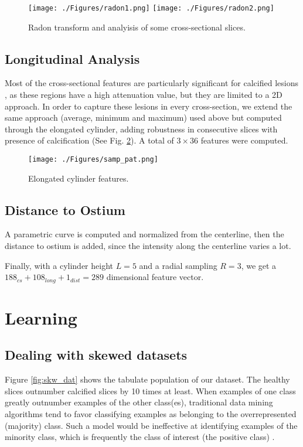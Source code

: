 \begin{figure}[ht]
	\centering
		\texttt{[image: ./Figures/radon1.png]}
		\texttt{[image: ./Figures/radon2.png]}
	\caption[Radon Transform]{Radon transform and analyisis of some cross-sectional slices.}
	\label{fig:rd1}
\end{figure}

\subsection{Longitudinal Analysis}

Most of the cross-sectional features are particularly significant for calcified lesions \citep{Tessmann2009}, as these regions have a high attenuation value, but they are limited to a 2D approach. In order to capture these lesions in every cross-section, we extend the same approach (average, minimum and maximum) used above but computed through the elongated cylinder, adding robustness in consecutive slices with presence of calcification (See Fig. \ref{fig:longi_feat}). A total of $3 \times 36$ features were computed.

\begin{figure}[ht]
	\centering
		\texttt{[image: ./Figures/samp\_pat.png]}
	\caption[Elongated Cylinder Features]{Elongated cylinder features.}
	\label{fig:longi_feat}
\end{figure}

\subsection{Distance to Ostium}
A parametric curve is computed and normalized from the centerline, then the distance to ostium is added, since the intensity along the centerline varies a lot. 

Finally, with a cylinder height $L = 5$ and a radial sampling $R = 3$, we get a $188_{cs}+108_{long}+1_{dist}=289$ dimensional feature vector.

\section{Learning}

\subsection{Dealing with skewed datasets}\label{dect:imba}

Figure \ref{fig:skw_dat} shows the tabulate population of our dataset. The healthy slices outnumber calcified slices by 10 times at least. When examples of one class greatly outnumber examples of the other class(es), traditional data mining algorithms tend to favor classifying examples as belonging to the overrepresented (majority) class. Such a model would be ineffective at identifying examples of the minority class, which is frequently the class of interest (the positive class) \citep{Seiffert2010}.

